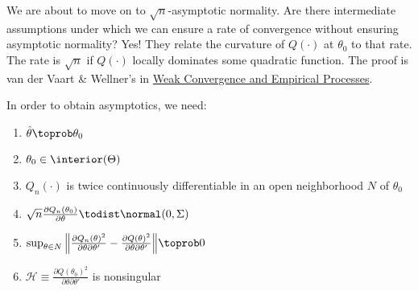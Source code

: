 \documentclass[10pt]{article}
\begin{document}
\begin{remark}
	We are about to move on to $\sqrt{n}$-asymptotic normality. Are there intermediate assumptions under which we can ensure a rate of convergence without ensuring asymptotic normality? Yes! They relate the curvature of $Q(\cdot)$ at $\theta_0$ to that rate. The rate is $\sqrt{n}$ if $Q(\cdot)$ locally dominates some quadratic function. The proof is van der Vaart \& Wellner's  in \href{https://link.springer.com/book/10.1007/978-1-4757-2545-2}{Weak Convergence and Empirical Processes}.
\end{remark}


\begin{assumption}\label{ass:asymptotics_extremum}
	In order to obtain asymptotics, we need:
	\begin{enumerate}
		\item $\hat{\theta}\toprob \theta_0$
		\item $\theta_0 \in \interior(\Theta)$
		\item $Q_n(\cdot)$ is twice continuously differentiable in an open neighborhood $N$ of $\theta_0$
		\item $\sqrt{n}\frac{\partial Q_n(\theta_0)}{\partial \theta} \todist \normal(0,\Sigma)$
		\item $\sup_{\theta\in N} \Big\|\frac{\partial Q_n(\theta)^2}{\partial \theta \partial \theta'} - \frac{\partial Q(\theta)^2}{\partial \theta \partial \theta'}\Big\| \toprob 0$
		\item $\mathcal{H} \equiv \frac{\partial Q(\theta_0)^2}{\partial \theta \partial \theta'}  $ is nonsingular
	\end{enumerate}
\end{assumption}
\end{document}
